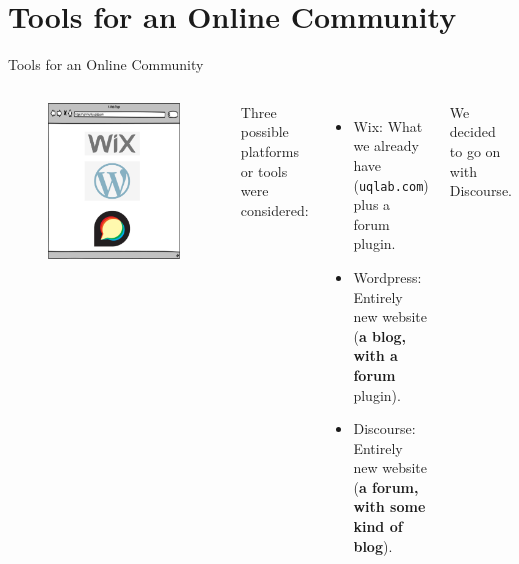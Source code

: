 \documentclass[]{rsuqbeamernew}
\begin{document}
\section{Tools for an Online Community}

\begin{frame}[t]{Tools for an Online Community}

  \begin{columns}
    \begin{minipage}[c][0.80\textheight][c]{\linewidth}
      \begin{figure}
        \centering
        \includegraphics[width=1.0\linewidth]{../figures/communityPlatform}
      \end{figure}
    \end{minipage}
      
    Three possible platforms or tools were considered:
  \begin{itemize}
    \item Wix: What we already have (\texttt{uqlab.com}) plus a forum plugin.
    \item Wordpress: Entirely new website (\textbf{a blog, with a forum} plugin).
    \item Discourse: Entirely new website (\textbf{a forum, with some kind of blog}).
  \end{itemize}
  We decided to go on with Discourse. %
  \hfill
  

\end{columns}
\end{frame}
\end{document}
